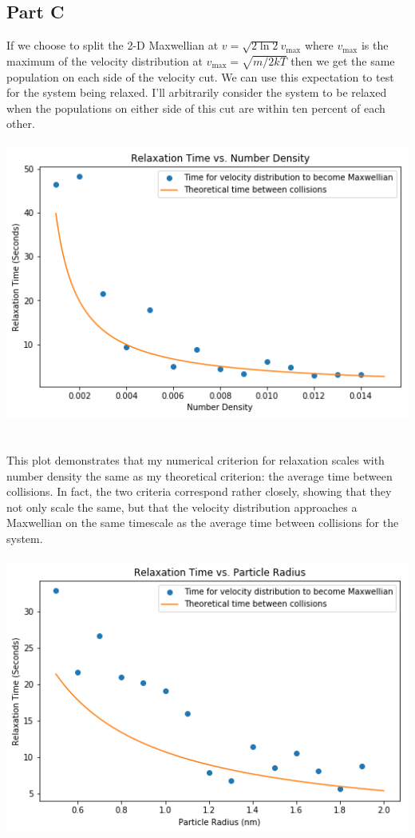 \documentclass[a4paper, 11pt]{article}
\begin{document}
	\subsection*{Part C}
		If we choose to split the 2-D Maxwellian at $v = \sqrt{2\ln2}v_\text{max}$ where $v_\text{max}$ is the maximum of 
		the velocity distribution at $v_\text{max} = \sqrt{m/2kT}$ 
		then we get the same population on each side of the velocity cut. We can use this expectation to test for the system 
		being relaxed. I'll arbitrarily consider the system to be relaxed when the populations on either side of this cut are within 
		ten percent of each other. 
		\ \\ \\
		\includegraphics[width=15cm]{relaxation_v_density.png}
		\ \\ \\
		This plot demonstrates that my numerical criterion for relaxation scales with number density 
		the same as my theoretical criterion: the average time between collisions. In fact, the two criteria correspond 
		rather closely, 
		showing that they not only scale the same, but that the velocity distribution approaches a Maxwellian on the same 
		timescale as the average time between collisions for the system. 
		\ \\ \\
		\includegraphics[width=15cm]{relaxation_v_radius.png}
\end{document}
